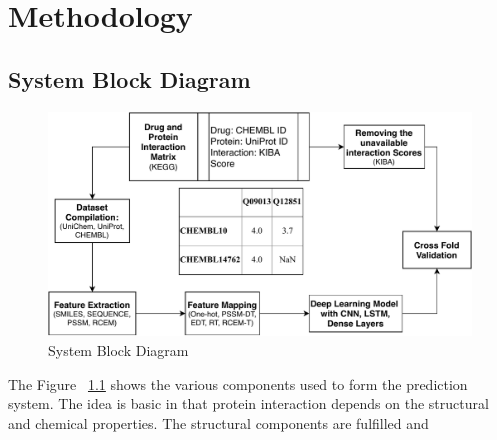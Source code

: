 \usetikzlibrary{arrows,automata}
\chapter{Methodology}

\section{System Block Diagram}



\begin{figure}[ht]
\includegraphics[width=1\linewidth]{mainmatter/3-Methodology/images/block.pdf}
\caption{System Block Diagram}
\label{fig:system}
\end{figure}

The Figure ~\ref{fig:system} shows the various components used to form the prediction system. The idea is basic in that protein interaction depends on the structural and chemical properties. The structural components are fulfilled and


